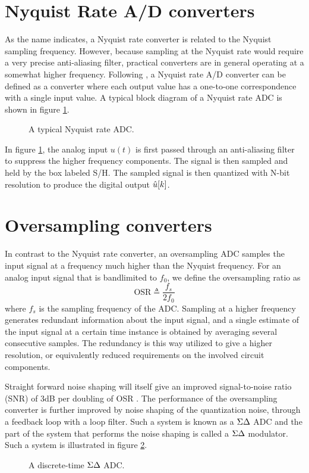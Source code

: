 \section{Nyquist Rate A/D converters}
As the name indicates, a Nyquist rate converter is related to the Nyquist sampling frequency. However, because sampling at the Nyquist rate would require a very precise anti-aliasing filter, practical converters are in general operating at a somewhat higher frequency. Following \cite{johns_martin}, a Nyquist rate A/D converter can be defined as a converter where each output value has a one-to-one correspondence with a single input value. A typical block diagram of a Nyquist rate ADC is shown in figure \ref{fig:nyquist_rate_adc}.
\label{subsec:nyquist_adc}
\begin{figure}[htbp]
    
    \centering
    \caption{A typical Nyquist rate ADC.}
    \label{fig:nyquist_rate_adc}
\end{figure}

In figure \ref{fig:nyquist_rate_adc}, the analog input $u(t)$ is first passed through an anti-aliasing filter to suppress the higher frequency components. The signal is then sampled and held by the box labeled S/H. The sampled signal is then quantized with N-bit resolution to produce the digital output $\hat{u}[k]$.

\section{Oversampling converters}
\label{subsec:oversampling_adc}
In contrast to the Nyquist rate converter, an oversampling ADC samples the input signal at a frequency much higher than the Nyquist frequency. For an analog input signal that is bandlimited to $f_0$, we define the oversampling ratio as
\begin{equation}
    \text{OSR} \triangleq \frac{f_s}{2f_0}
\end{equation}
where $f_s$ is the sampling frequency of the ADC. Sampling at a higher frequency generates redundant information about the input signal, and a single estimate of the input signal at a certain time instance is obtained by averaging several consecutive samples. The redundancy is this way utilized to give a higher resolution, or equivalently reduced requirements on the involved circuit components.

Straight forward noise shaping will itself give an improved signal-to-noise ratio (SNR) of 3dB per doubling of OSR \cite{johns_martin}. The performance of the oversampling converter is further improved by noise shaping of the quantization noise, through a feedback loop with a loop filter. Such a system is known as a $\Sigma\Delta$ ADC and the part of the system that performs the noise shaping is called a $\Sigma\Delta$ modulator. Such a system is illustrated in figure \ref{fig:dtsdmod}.
\begin{figure}[htbp]
    
    \centering
    \caption{A discrete-time $\Sigma\Delta$ ADC.}
    \label{fig:dtsdmod}
\end{figure}


